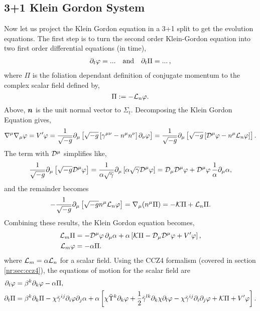 \subsection{3+1 Klein Gordon System} \label{boson:sec:3+1kgeqn}
Now let us project the Klein Gordon equation in a 3+1 split to get the evolution equations. The first step is to turn the second order Klein-Gordon equation into two first order differential equations (in time),
\begin{align}
\partial_t \varphi = ...  \quad {\rm and}\quad \partial_t \Pi = ... \,,
\end{align}
where $\Pi$ is the foliation dependant definition of conjugate momentum to the complex scalar field defined by,
\begin{equation} \Pi:= -\mathcal{L}_n \varphi. \label{boson:eq:Pidef}\end{equation}
Above, $\boldsymbol{n}$ is the unit normal vector to $\Sigma_t$. Decomposing the Klein Gordon Equation gives,
\begin{equation}
\nabla^\mu \nabla_\mu \varphi = V' \varphi = \frac{1}{\sqrt{-g}} \partial_\mu \left[ \sqrt{-g}\left[\gamma^{\mu\nu}-n^\mu n^\nu\right]\partial_\nu \varphi\right]
= \frac{1}{\sqrt{-g}} \partial_\mu \left[ \sqrt{-g}\left[\mathcal{D}^\mu\varphi-n^\mu \mathcal{L}_n\varphi\right]\right].
\end{equation}
The term with $\mathcal{D}^\mu$ simplifies like,
\begin{equation}\frac{1}{\sqrt{-g}} \partial_\mu \left[ \sqrt{-g}\mathcal{D}^\mu\varphi\right] =
\frac{1}{\alpha\sqrt{\gamma}} \partial_\mu \left[\alpha\sqrt{\gamma}\mathcal{D}^\mu\varphi\right]  =
\mathcal{D}_\mu \mathcal{D}^\mu \varphi + \mathcal{D}^\mu \varphi \,\frac{1}{\alpha}\partial_\mu  \alpha,\end{equation}
and the remainder becomes
\begin{equation}-\frac{1}{\sqrt{-g}} \partial_\mu \left[ \sqrt{-g}n^\mu \mathcal{L}_n\varphi\right]
= \nabla_\mu( n^\mu \Pi )
= -\mathcal{K}\Pi + \mathcal{L}_n \Pi.\end{equation}
Combining these results, the Klein Gordon equation becomes,
\begin{align}
 \mathcal{L}_m \Pi &= - \mathcal{D}^\mu\varphi\,\partial_\mu \alpha+\alpha\left[\mathcal{K}\Pi - \mathcal{D}_\mu \mathcal{D}^\mu \varphi  + V'\varphi\right], \\
 \mathcal{L}_m \varphi &= - \alpha\Pi.\end{align}
where $\mathcal{L}_m = \alpha \mathcal{L}_n$ for a scalar field. Using the CCZ4 formalism (covered in section \ref{nr:sec:ccz4}), the equations of motion for the scalar field are
\begin{align}
\partial_t \varphi &= \beta^k\partial_k \varphi - \alpha\Pi ,\label{boson:eq:ccz4kg1}\\
\partial_t \Pi &= \beta^k\partial_k\Pi -\chi \tilde{\gamma}^{ij}\partial_i \varphi \partial_j \alpha + \alpha \left[ \chi \tilde{\Upsilon}^k\partial_k \varphi+\frac{1}{2} \tilde{\gamma}^{lk}\partial_k\chi\partial_l\varphi  - \chi \tilde{\gamma}^{ij}\partial_i \partial_j \varphi + \mathcal{K} \Pi + V' \varphi \right].\label{boson:eq:ccz4kg2}
\end{align}
